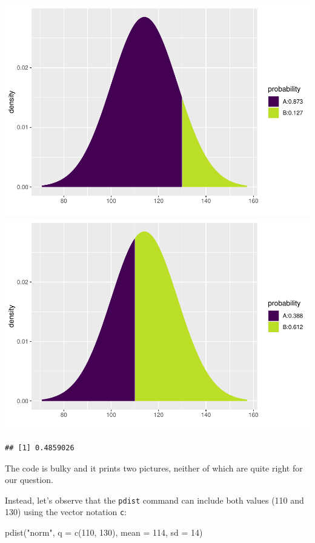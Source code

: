 \documentclass[
]{book}
\newenvironment{Shaded}{\begin{snugshade}}{\end{snugshade}}
\newcommand{\AttributeTok}[1]{\textcolor[rgb]{0.77,0.63,0.00}{#1}}
\newcommand{\DecValTok}[1]{\textcolor[rgb]{0.00,0.00,0.81}{#1}}
\newcommand{\FunctionTok}[1]{\textcolor[rgb]{0.00,0.00,0.00}{#1}}
\newcommand{\NormalTok}[1]{#1}
\newcommand{\StringTok}[1]{\textcolor[rgb]{0.31,0.60,0.02}{#1}}
\begin{document}
\includegraphics{intro_stats_files/figure-latex/unnamed-chunk-340-1.pdf} \includegraphics{intro_stats_files/figure-latex/unnamed-chunk-340-2.pdf}

\begin{verbatim}
## [1] 0.4859026
\end{verbatim}

The code is bulky and it prints two pictures, neither of which are quite right for our question.

Instead, let's observe that the \texttt{pdist} command can include both values (110 and 130) using the vector notation \texttt{c}:

\begin{Shaded}
\begin{Highlighting}[]
\FunctionTok{pdist}\NormalTok{(}\StringTok{"norm"}\NormalTok{, }\AttributeTok{q =} \FunctionTok{c}\NormalTok{(}\DecValTok{110}\NormalTok{, }\DecValTok{130}\NormalTok{), }\AttributeTok{mean =} \DecValTok{114}\NormalTok{, }\AttributeTok{sd =} \DecValTok{14}\NormalTok{)}
\end{Highlighting}
\end{Shaded}
\end{document}

